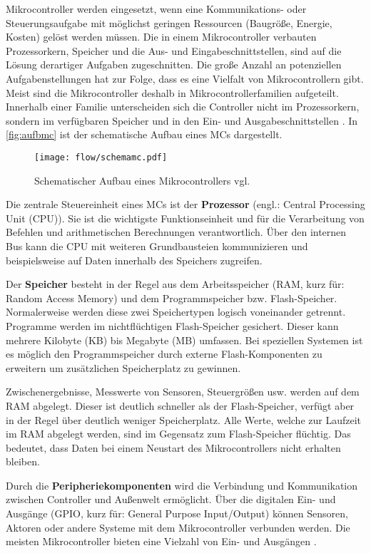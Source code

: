 Mikrocontroller werden eingesetzt, wenn eine Kommunikations- oder Steuerungsaufgabe mit möglichst geringen Ressourcen (Baugröße, Energie, Kosten) gelöst werden müssen. Die in einem Mikrocontroller verbauten Prozessorkern, Speicher und die Aus- und Eingabeschnittstellen, sind auf die Lösung derartiger Aufgaben zugeschnitten. Die große Anzahl an potenziellen Aufgabenstellungen hat zur Folge, dass es eine Vielfalt von Mikrocontrollern gibt. Meist sind die Mikrocontroller deshalb in Mikrocontrollerfamilien aufgeteilt. Innerhalb einer Familie unterscheiden sich die Controller nicht im Prozessorkern, sondern im verfügbaren Speicher und in den Ein- und Ausgabeschnittstellen \cite{ECHT2005}. In \autoref{fig:aufbmc} ist der schematische Aufbau eines MCs dargestellt.
\begin{figure}[th]
	\centering
		\texttt{[image: flow/schemamc.pdf]}
	\caption{Schematischer Aufbau eines Mikrocontrollers vgl. \cite{Brinkschulte:2002:Mikrocontroller}}
	\label{fig:aufbmc}
\end{figure}

Die zentrale Steuereinheit eines MCs ist der \textbf{Prozessor} (engl.: Central Processing Unit (CPU)). Sie ist die wichtigste Funktionseinheit und für die Verarbeitung von Befehlen und arithmetischen Berechnungen verantwortlich. Über den internen Bus kann die CPU mit weiteren Grundbausteien kommunizieren und beispielsweise auf Daten innerhalb des Speichers zugreifen.

Der \textbf{Speicher} besteht in der Regel aus dem Arbeitsspeicher (RAM, kurz für: Random Access Memory) und dem Programmspeicher bzw. Flash-Speicher. Normalerweise werden diese zwei Speichertypen logisch voneinander getrennt. Programme werden im nichtflüchtigen Flash-Speicher gesichert. Dieser kann mehrere Kilobyte (KB) bis Megabyte (MB) umfassen. Bei speziellen Systemen ist es möglich den Programmspeicher durch externe Flash-Komponenten zu erweitern um zusätzlichen Speicherplatz zu gewinnen.

Zwischenergebnisse, Messwerte von Sensoren, Steuergrößen usw. werden auf dem RAM abgelegt. Dieser ist deutlich schneller als der Flash-Speicher, verfügt aber in der Regel über deutlich weniger Speicherplatz. Alle Werte, welche zur Laufzeit im RAM abgelegt werden, sind im Gegensatz zum Flash-Speicher flüchtig. Das bedeutet, dass Daten bei einem Neustart des Mikrocontrollers nicht erhalten bleiben.

Durch die \textbf{Peripheriekomponenten} wird die Verbindung und Kommunikation zwischen Controller und Außenwelt ermöglicht. Über die digitalen Ein- und Ausgänge (GPIO, kurz für: General Purpose Input/Output) können Sensoren, Aktoren oder andere Systeme mit dem Mikrocontroller verbunden werden. Die meisten Mikrocontroller bieten eine Vielzahl von Ein- und Ausgängen \cite[S. 13-16]{SOM2012}.

